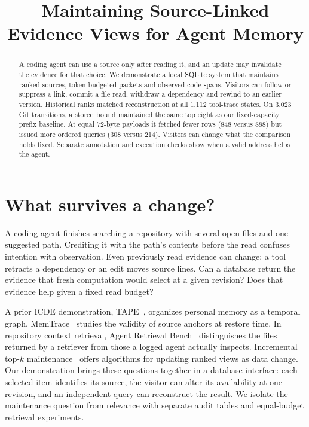 \documentclass[conference]{IEEEtran}
\title{Maintaining Source-Linked Evidence Views for Agent Memory}
\author{\IEEEauthorblockN{Anonymous authors}}
\begin{document}
\maketitle
\begin{abstract}
A coding agent can use a source only after reading it, and an update may invalidate the evidence for that choice. We demonstrate a local SQLite system that maintains ranked sources, token-budgeted packets and observed code spans. Visitors can follow or suppress a link, commit a file read, withdraw a dependency and rewind to an earlier version. Historical ranks matched reconstruction at all 1,112 tool-trace states. On 3,023 Git transitions, a stored bound maintained the same top eight as our fixed-capacity prefix baseline. At equal 72-byte payloads it fetched fewer rows (848 versus 888) but issued more ordered queries (308 versus 214). Visitors can change what the comparison holds fixed. Separate annotation and execution checks show when a valid address helps the agent.
\end{abstract}

\section{What survives a change?}
A coding agent finishes searching a repository with several open files and one suggested path. Crediting it with the path's contents before the read confuses intention with observation. Even previously read evidence can change: a tool retracts a dependency or an edit moves source lines. Can a database return the evidence that fresh computation would select at a given revision? Does that evidence help given a fixed read budget?

A prior ICDE demonstration, TAPE~\cite{tape}, organizes personal memory as a temporal graph. MemTrace~\cite{memtrace} studies the validity of source anchors at restore time. In repository context retrieval, Agent Retrieval Bench~\cite{arb} distinguishes the files returned by a retriever from those a logged agent actually inspects. Incremental top-$k$ maintenance~\cite{topk} offers algorithms for updating ranked views as data change. Our demonstration brings these questions together in a database interface: each selected item identifies its source, the visitor can alter its availability at one revision, and an independent query can reconstruct the result. We isolate the maintenance question from relevance with separate audit tables and equal-budget retrieval experiments.
\end{document}
